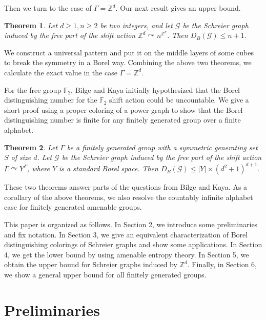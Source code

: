 \documentclass[11pt, reqno, a4paper]{amsart}
\theoremstyle{plain}
\newtheorem{theorem}{Theorem}[section]
\theoremstyle{definition}
\theoremstyle{remark}
\begin{document}
Then we turn to the case of $\Gamma=\mathbb{Z}^d$. Our next result gives an upper bound.
\begin{theorem}
Let $d\ge 1,n\ge 2$ be two integers, and let $\mathcal{G}$ be the Schreier graph induced by the free part of the shift action $\mathbb{Z}^d \curvearrowright n^{\mathbb{Z}^d}$. Then $D_{B}(\mathcal{G})\le n+1$.
\end{theorem}

We construct a universal pattern and put it on the middle layers of some cubes to break the symmetry in a Borel way. Combining the above two theorems, we calculate the exact value in the case $\Gamma=\mathbb{Z}^d$.

For the free group $\mathbb{F}_2$,  Bilge and Kaya initially hypothesized that the Borel distinguishing number for the $\mathbb{F}_2$ shift action could be uncountable. We give a short proof using a proper coloring of a power graph to show that the Borel distinguishing number is finite for any finitely generated group over a finite alphabet. 

\begin{theorem}
Let $\Gamma$ be a finitely generated group with a symmetric generating set $S$ of size $d$. Let $\mathcal{G}$ be the Schreier graph induced by the free part of the shift action $\Gamma \curvearrowright Y^\Gamma$, where $Y$ is a standard Borel space. Then $D_B(\mathcal{G}) \le |Y| \times (d^2+1)^{d+1}. $
\end{theorem}

These two theorems answer parts of the questions from Bilge and Kaya. As a corollary of the above theorems, we also resolve the countably infinite alphabet case for finitely generated amenable groups.

This paper is organized as follows. In Section 2, we introduce some preliminaries and fix notation. In Section 3, we  give an equivalent characterization of Borel distinguishing colorings of Schreier graphs and show some applications. In Section 4, we get the lower bound by using amenable entropy theory. In Section 5, we obtain the upper bound for Schreier graphs induced by $\mathbb{Z}^d$. Finally, in Section 6, we show a general upper bound for all finitely generated groups.


\section{Preliminaries}
\end{document}
